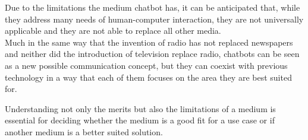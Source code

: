 Due to the limitations the medium chatbot has, it can be anticipated
that, while they address many needs of human-computer interaction,
they are not universally applicable and they are not able to replace all other media.
\\

Much in the same way that the invention of radio has not replaced newspapers
and neither did the introduction of television replace radio,
chatbots can be seen as a new possible communication concept,
but they can coexist with previous technology in a way that each of them focuses on the area they are best suited for.

Understanding not only the merits but also the limitations of a medium is essential for deciding
whether the medium is a good fit for a use case or if another medium is a better suited solution.
\\
